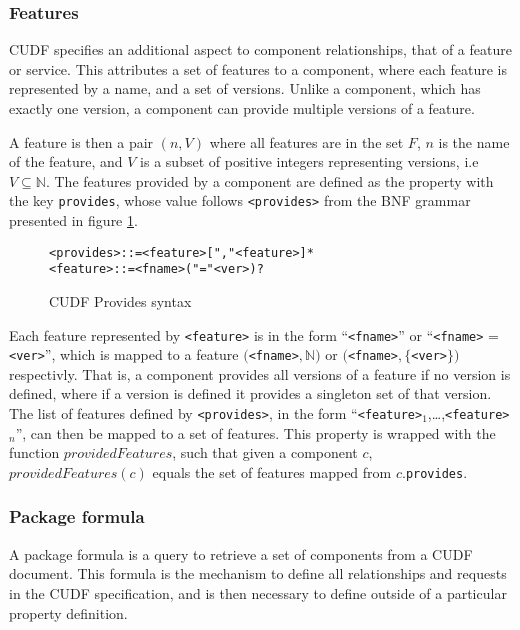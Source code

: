 \subsubsection{Features}
CUDF specifies an additional aspect to component relationships, that of a feature or service.
This attributes a set of features to a component, where each feature is represented by a name, and a set of versions.
Unlike a component, which has exactly one version, a component can provide multiple versions of a feature.

A feature is then a pair $(n,V)$ where all features are in the set $F$, $n$ is the name of the feature, and $V$ is a subset of positive integers representing versions, i.e $V \subseteq \mathbb{N}$.
The features provided by a component are defined as the property with the key \verb+provides+, 
whose value follows \verb+<provides>+ from the BNF grammar presented in figure \ref{formal.cudfprovidessyntax}.

\begin{figure}[htp] 
\begin{center}
\begin{alltt}
<provides> ::= <feature> ["," <feature>]*
<feature> :: = <fname> ("=" <ver>)?
\end{alltt}
  \caption[Provides syntax]{CUDF Provides syntax}
  \label{formal.cudfprovidessyntax}
\end{center}
\end{figure}

Each feature represented by \verb+<feature>+ is in the form ``\verb+<fname>+'' or  ``\verb+<fname>+ = \verb+<ver>+'', 
which is mapped to a feature $($\verb+<fname>+$,\mathbb{N})$ or $($\verb+<fname>+$,\{$\verb+<ver>+$\})$ respectivly.
That is, a component provides all versions of a feature if no version is defined, where if a version is defined it provides a singleton set of that version. 
The list of features defined by \verb+<provides>+, in the form ``\verb+<feature>+$_1$,\ldots,\verb+<feature>+$_n$'', can then be mapped to a set of features.
This property is wrapped with the function $providedFeatures$,
such that given a component $c$, $providedFeatures(c)$ equals the set of features mapped from $c$.\verb+provides+.

\subsubsection{Package formula}
A package formula is a query to retrieve a set of components from a CUDF document.
This formula is the mechanism to define all relationships and requests in the CUDF specification,
and is then necessary to define outside of a particular property definition. 

